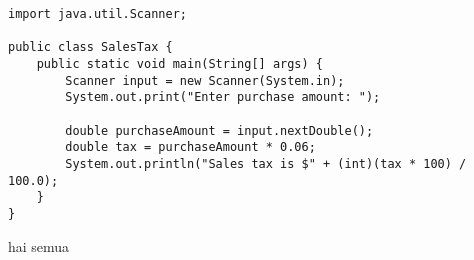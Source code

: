 \documentclass{article}
\begin{document}
\begin{verbatim}
import java.util.Scanner;

public class SalesTax {
    public static void main(String[] args) {
        Scanner input = new Scanner(System.in);
        System.out.print("Enter purchase amount: ");

        double purchaseAmount = input.nextDouble();
        double tax = purchaseAmount * 0.06;
        System.out.println("Sales tax is $" + (int)(tax * 100) / 100.0);
    }
}
\end{verbatim}
hai semua
\end{document}
